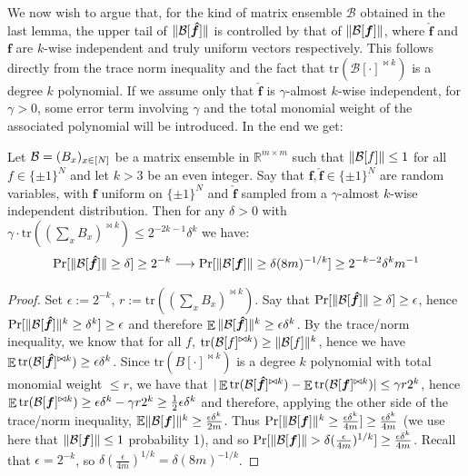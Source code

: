 We now wish to argue that, for the kind of matrix ensemble $\mathcal{B}$ obtained in the last lemma, the upper tail of $\Vert \mathcal{B}[\bm{\hat{f}}] \Vert$ is controlled by that of $\Vert \mathcal{B}[\bm{f}] \Vert$, where $\bm{\hat{f}}$ and $\bm{f}$ are $k$-wise independent and truly uniform vectors respectively. This follows directly from the trace norm inequality and the fact that $\mathrm{tr}(\mathcal{B}[\cdot]^{\bowtie k})$ is a degree $k$ polynomial. If we assume only that $\bm{\hat{f}}$ is $\gamma$-almost $k$-wise independent, for $\gamma > 0$, some error term involving $\gamma$ and the total monomial weight of the associated polynomial will be introduced. In the end we get:
\begin{lemma}\label{cellprobe:lem:trace-poly}
Let $\mathcal{B} = (B_x)_{x \in [N]}$ be a matrix ensemble in $\mathbb{R}^{m \times m}$ such that $\Vert \mathcal{B}[f] \Vert \leq 1$ for all $f\in \{\pm 1\}^N$ and let $k>3$ be an even integer. Say that $\bm{f}, \bm{\hat{f}}\in \{\pm 1\}^N$ are random variables, with $\bm{f}$ uniform on $\{\pm 1\}^N$ and $\bm{\hat{f}}$ sampled from a $\gamma$-almost $k$-wise independent distribution. Then for any $\delta > 0$ with $\gamma\cdot  \mathrm{tr}((\sum_x B_x)^{\bowtie k}) \leq 2^{-2k - 1} \delta^k$ we have:
\[
\Pr[\Vert \mathcal{B}[\bm{\hat{f}}] \Vert \geq \delta] \geq 2^{-k} \longrightarrow \Pr[\Vert \mathcal{B}[\bm{f}] \Vert \geq \delta (8m)^{-1/k}] \geq 2^{-k-2} \delta^k m^{-1}
\]
\end{lemma}
\begin{proof}
Set $\epsilon:= 2^{-k}$, $r:= \mathrm{tr}((\sum_x B_x)^{\bowtie k})$. Say that $\Pr[\Vert \mathcal{B}[\bm{\hat{f}}] \Vert \geq \delta] \geq \epsilon$, hence  $\Pr[\Vert \mathcal{B}[\bm{\hat{f}}] \Vert^k \geq \delta^k] \geq \epsilon$ and therefore $\mathop{\mathbb{E}} \Vert \mathcal{B}[\bm{\hat{f}}] \Vert^k \geq \epsilon \delta^k$. By the trace/norm inequality, we know that for all $f$, $ \mathrm{tr}(\mathcal{B}[f]^{\bowtie k}) \geq \Vert \mathcal{B}[f] \Vert^k $, hence we have $\mathop{\mathbb{E}} \mathrm{tr}(\mathcal{B}[\bm{\hat{f}}]^{\bowtie k}) \geq \epsilon \delta^k$. 
Since $\mathrm{tr}(B[\cdot]^{\bowtie k})$ is a degree $k$ polynomial with total monomial weight $\leq r$, we have that $|\mathop{\mathbb{E}} \mathrm{tr}(\mathcal{B}[\bm{\hat{f}}]^{\bowtie k}) - \mathop{\mathbb{E}} \mathrm{tr}(\mathcal{B}[\bm{f}]^{\bowtie k})| \leq \gamma r 2^k$, hence $\mathop{\mathbb{E}} \mathrm{tr}(\mathcal{B}[\bm{f}]^{\bowtie k}) \geq \epsilon \delta^k - \gamma r2^k \geq \frac{1}{2} \epsilon \delta^k$ and therefore, applying the other side of the trace/norm inequality, $\mathbb{E}\Vert \mathcal{B}[\bm{f}] \Vert^k \geq \frac{\epsilon \delta^k}{2m}$. Thus $\Pr[\Vert \mathcal{B}[\bm{f}] \Vert^k \geq   \frac{\epsilon \delta^k}{4m} ] \geq  \frac{\epsilon \delta^k}{4m} $ (we use here that $\Vert \mathcal{B}[\bm{f}] \Vert\leq 1$ probability 1), and so $\Pr[\Vert \mathcal{B}[\bm{f}] \Vert >  \delta (\frac{\epsilon}{4m})^{1/k} ] \geq  \frac{\epsilon \delta^k}{4m}$. Recall that $\epsilon = 2^{-k}$, so $\delta(\frac{\epsilon}{4m})^{1/k} = \delta (8m)^{-1/k}$. 
\end{proof}

